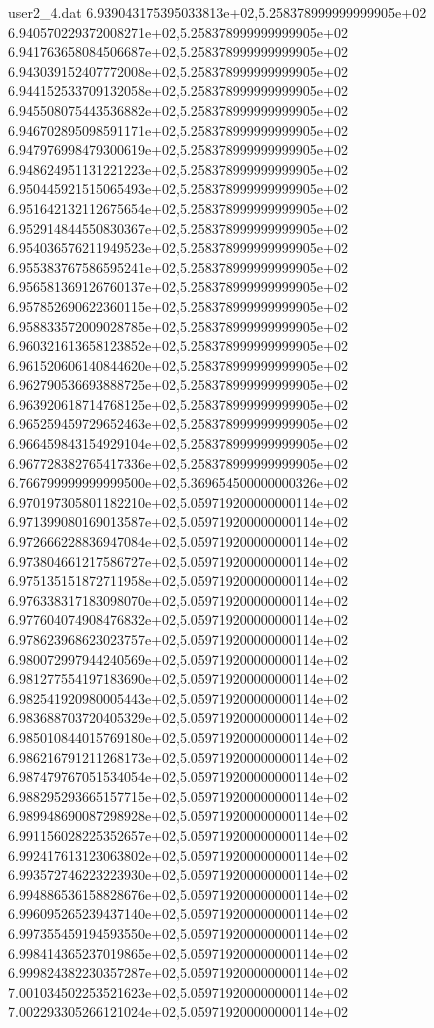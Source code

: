 \begin{filecontents}{user2_4.dat}
6.939043175395033813e+02,5.258378999999999905e+02
6.940570229372008271e+02,5.258378999999999905e+02
6.941763658084506687e+02,5.258378999999999905e+02
6.943039152407772008e+02,5.258378999999999905e+02
6.944152533709132058e+02,5.258378999999999905e+02
6.945508075443536882e+02,5.258378999999999905e+02
6.946702895098591171e+02,5.258378999999999905e+02
6.947976998479300619e+02,5.258378999999999905e+02
6.948624951131221223e+02,5.258378999999999905e+02
6.950445921515065493e+02,5.258378999999999905e+02
6.951642132112675654e+02,5.258378999999999905e+02
6.952914844550830367e+02,5.258378999999999905e+02
6.954036576211949523e+02,5.258378999999999905e+02
6.955383767586595241e+02,5.258378999999999905e+02
6.956581369126760137e+02,5.258378999999999905e+02
6.957852690622360115e+02,5.258378999999999905e+02
6.958833572009028785e+02,5.258378999999999905e+02
6.960321613658123852e+02,5.258378999999999905e+02
6.961520606140844620e+02,5.258378999999999905e+02
6.962790536693888725e+02,5.258378999999999905e+02
6.963920618714768125e+02,5.258378999999999905e+02
6.965259459729652463e+02,5.258378999999999905e+02
6.966459843154929104e+02,5.258378999999999905e+02
6.967728382765417336e+02,5.258378999999999905e+02
6.766799999999999500e+02,5.369654500000000326e+02
6.970197305801182210e+02,5.059719200000000114e+02
6.971399080169013587e+02,5.059719200000000114e+02
6.972666228836947084e+02,5.059719200000000114e+02
6.973804661217586727e+02,5.059719200000000114e+02
6.975135151872711958e+02,5.059719200000000114e+02
6.976338317183098070e+02,5.059719200000000114e+02
6.977604074908476832e+02,5.059719200000000114e+02
6.978623968623023757e+02,5.059719200000000114e+02
6.980072997944240569e+02,5.059719200000000114e+02
6.981277554197183690e+02,5.059719200000000114e+02
6.982541920980005443e+02,5.059719200000000114e+02
6.983688703720405329e+02,5.059719200000000114e+02
6.985010844015769180e+02,5.059719200000000114e+02
6.986216791211268173e+02,5.059719200000000114e+02
6.987479767051534054e+02,5.059719200000000114e+02
6.988295293665157715e+02,5.059719200000000114e+02
6.989948690087298928e+02,5.059719200000000114e+02
6.991156028225352657e+02,5.059719200000000114e+02
6.992417613123063802e+02,5.059719200000000114e+02
6.993572746223223930e+02,5.059719200000000114e+02
6.994886536158828676e+02,5.059719200000000114e+02
6.996095265239437140e+02,5.059719200000000114e+02
6.997355459194593550e+02,5.059719200000000114e+02
6.998414365237019865e+02,5.059719200000000114e+02
6.999824382230357287e+02,5.059719200000000114e+02
7.001034502253521623e+02,5.059719200000000114e+02
7.002293305266121024e+02,5.059719200000000114e+02

\end{filecontents}
